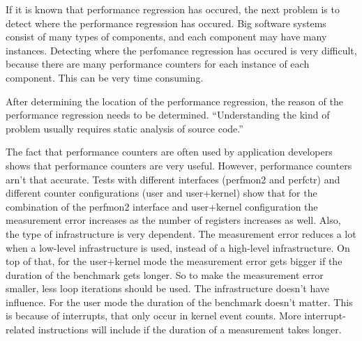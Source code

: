 If it is known that performance regression has occured, the next problem is to detect where the performance regression has occured. Big software systems consist of many types of components, and each component may have many instances. Detecting where the perfomance regression has occured is very difficult, because there are many performance counters for each instance of each component. This can be very time consuming.

After determining the location of the performance regression, the reason of the performance regression needs to be determined. ``Understanding the kind of problem usually requires static analysis of source code.'' \cite{nguyen2012using}

The fact that performance counters are often used by application developers shows that performance counters are very useful. However, performance counters arn't that accurate. Tests with different interfaces (perfmon2 and perfctr) and different counter configurations (user and user+kernel) show that for the combination of the perfmon2 interface and user+kernel configuration the measurement error increases as the number of registers increases as well. \cite{AccuracyPerformanceCounter}
Also, the type of infrastructure is very dependent. The measurement error reduces a lot when a low-level infrastructure is used, instead of a high-level infrastructure.
On top of that, for the user+kernel mode the measurement error gets bigger if the duration of the benchmark gets longer. \cite{AccuracyPerformanceCounter} So to make the measurement error smaller, less loop iterations should be used.  The infrastructure doesn't have influence. For the user mode the duration of the benchmark doesn't matter. This is because of interrupts, that only occur in kernel event counts. More interrupt-related instructions will include if the duration of a measurement takes longer.
